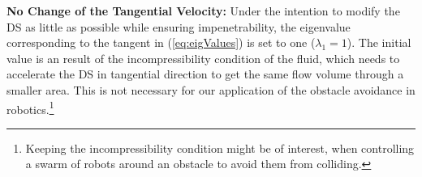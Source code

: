 

\vspace{1ex} \noindent
\textbf{No Change of the Tangential Velocity:}
Under the intention to modify the DS as little as possible while ensuring impenetrability, the eigenvalue corresponding to the tangent in (\ref{eq:eigValues}) is set to one ($\lambda_1 = 1$). The initial value is an result of the incompressibility condition of the fluid,  which needs to accelerate the DS in tangential direction to get the same flow volume through a smaller area. This is not necessary for our application of the obstacle avoidance in robotics.\footnote{Keeping the incompressibility condition might be of interest, when controlling a swarm of robots around an obstacle to avoid them from colliding.}

